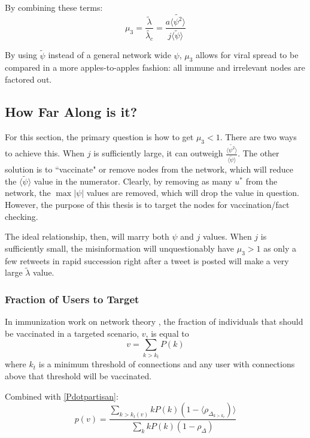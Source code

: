 \documentclass[preprint,review,12pt]{elsarticle}
\begin{document}
By combining these terms:
\begin{equation}
\label{mu_3 equation}
    \mu_3 = \frac{\tilde{\lambda}}{\tilde{\lambda_c}} = \frac{a \langle \tilde{\psi^2} \rangle}{j\langle \tilde{\psi} \rangle}
\end{equation}

By using $\tilde{\psi}$ instead of a general network wide $\psi$, $\mu_3$ allows for viral spread to be compared in a more apples-to-apples fashion: all immune and irrelevant nodes are factored out. 


\subsection{How Far Along is it?}
For this section, the primary question is how to get $\mu_3 < 1$. There are two ways to achieve this. When $j$ is sufficiently large, it can outweigh $\frac{\langle \tilde{\psi^2} \rangle}{\langle \tilde{\psi} \rangle}$. The other solution is to ``vaccinate" or remove nodes from the network, which will reduce the $\langle \tilde{\psi} \rangle$ value in the numerator. Clearly, by removing as many $u^*$ from the network, the $\max |\psi|$ values are removed, which will drop the value in question. However, the purpose of this thesis is to target the nodes for vaccination/fact checking. 

The ideal relationship, then, will marry both $\psi$ and $j$ values. When $j$ is sufficiently small, the misinformation will unquestionably have $\mu_3 > 1$ as only a few retweets in rapid succession right after a tweet is posted will make a very large $\tilde{\lambda}$ value.

\subsubsection{Fraction of Users to Target}
In immunization work on network theory \citep{pastor2002immunization}, the fraction of individuals that should be vaccinated in a targeted scenario, $v$, is equal to 
\begin{equation}
    v = \sum_{k > k_t}P(k)
\end{equation}
where $k_t$ is a minimum threshold of connections and any user with connections above that threshold will be vaccinated. 

Combined with \ref{Pdotpartisan}:
\begin{equation}
\label{probability of vaccinated}
p(v) = \frac{\sum_{k>k_t(v)}kP(k)(1-\langle \rho_{\Delta_{k>k_t}})\rangle}{\sum_{k}kP(k)(1-\rho_{\Delta})}
\end{equation}
\end{document}
